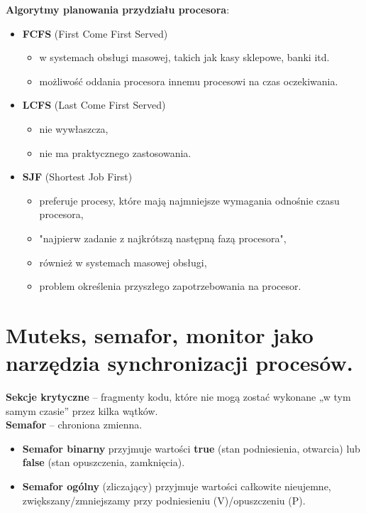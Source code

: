 \documentclass[main.tex]{subfiles}
\begin{document}
    \noindent \textbf{Algorytmy planowania przydziału procesora}:
    \begin{itemize}
        \item \textbf{FCFS} (First Come First Served)
        \begin{itemize}[noitemsep]
            \item w systemach obsługi masowej, takich jak kasy sklepowe, banki itd.
            \item możliwość oddania procesora innemu procesowi na czas oczekiwania.
        \end{itemize}

        \item \textbf{LCFS} (Last Come First Served)
        \begin{itemize}[noitemsep]
            \item nie wywłaszcza,
            \item nie ma praktycznego zastosowania.
        \end{itemize}

        \item \textbf{SJF} (Shortest Job First)
        \begin{itemize}
            \item preferuje procesy, które mają najmniejsze wymagania odnośnie czasu procesora,
            \item "najpierw zadanie z najkrótszą następną fazą procesora",
            \item również w systemach masowej obsługi,
            \item problem określenia przyszłego zapotrzebowania na procesor.
        \end{itemize}
    \end{itemize}


    \section{Muteks, semafor, monitor jako narzędzia synchronizacji procesów.}
    \textbf{Sekcje krytyczne} -- fragmenty kodu, które nie mogą zostać wykonane „w tym samym czasie” przez kilka wątków.\\

    \noindent \textbf{Semafor} -- chroniona zmienna.
    \begin{itemize}
        \item \textbf{Semafor binarny} przyjmuje wartości \textbf{true} (stan podniesienia, otwarcia) lub
        \textbf{false} (stan opuszczenia, zamknięcia).
        \item \textbf{Semafor ogólny} (zliczający) przyjmuje wartości całkowite nieujemne, zwiększany/zmniejszamy
        przy podniesieniu (V)/opuszczeniu (P).
    \end{itemize}
\end{document}
